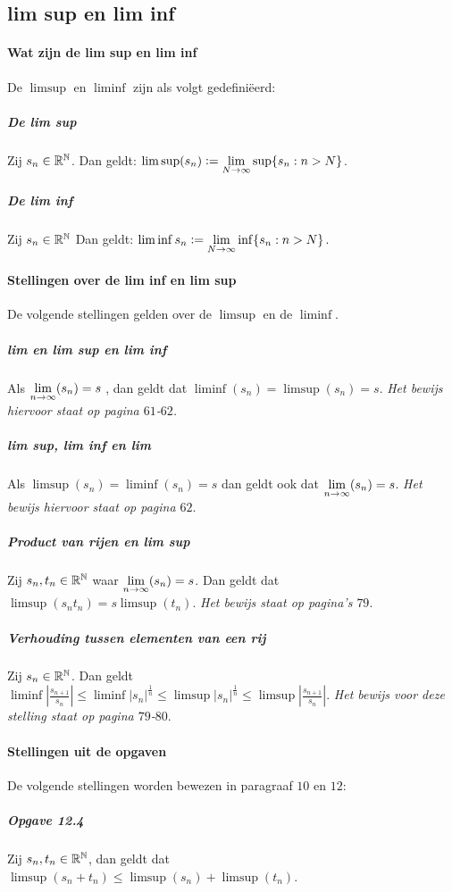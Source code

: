 \subsection{lim sup en lim inf}

\paragraph{Wat zijn de lim sup en lim inf} De $\limsup$ en $\liminf$ zijn als volgt gedefiniëerd:

\subparagraph{De lim sup} Zij $s_{n}\in\mathbb{R}^{\mathbb{N}}$. Dan geldt: $\limsup(s_{n})\vcentcolon=\underset{N\to\infty}{\text{lim}}\sup\{s_{n}:n>N\}$.

\subparagraph{De lim inf} Zij $s_{n}\in\mathbb{R}^{\mathbb{N}}$ Dan geldt: $\liminf{s_{n}}\vcentcolon=\underset{N\to\infty}{\text{lim}}\inf\{s_{n}:n>N\}$.

\paragraph{Stellingen over de lim inf en lim sup} De volgende stellingen gelden over de $\limsup$ en de $\liminf$.

\subparagraph{lim en lim sup en lim inf} Als $\underset{n\to\infty}{\text{lim}}(s_{n}) = s$ , dan geldt dat $\liminf(s_{n})=\limsup(s_{n})=s$. \textit{Het bewijs hiervoor staat op pagina $61$-$62$.}

\subparagraph{lim sup, lim inf en lim} Als $\limsup(s_{n})=\liminf(s_{n})=s$ dan geldt ook dat $\underset{n\to\infty}{\text{lim}}(s_{n})=s$. \textit{Het bewijs hiervoor staat op pagina $62$}.

\subparagraph{Product van rijen en lim sup} Zij $s_{n},t_{n}\in\mathbb{R}^{\mathbb{N}}$ waar $\underset{n\to\infty}{\text{lim}}(s_{n})=s$. Dan geldt dat\\$\limsup(s_{n}t_{n})=s\limsup(t_{n})$. \textit{Het bewijs staat op pagina's $79$}.

\subparagraph{Verhouding tussen elementen van een rij} Zij $s_{n}\in\mathbb{R}^{\mathbb{N}}$. Dan geldt\\ $\liminf|\frac{s_{n+1}}{s_{n}}|\leq\liminf|s_{n}|^{\frac{1}{n}}\leq\limsup|s_{n}|^{\frac{1}{n}}\leq\limsup|\frac{s_{n+1}}{s_{n}}|$. \textit{Het bewijs voor deze stelling staat op pagina $79$-$80$}.

\paragraph{Stellingen uit de opgaven} De volgende stellingen worden bewezen in paragraaf $10$ en $12$:

\subparagraph{Opgave 12.4} Zij $s_{n},t_{n}\in\mathbb{R}^{\mathbb{N}}$, dan geldt dat $\limsup(s_{n}+t_{n})\leq\limsup(s_{n})+\limsup(t_{n})$.

